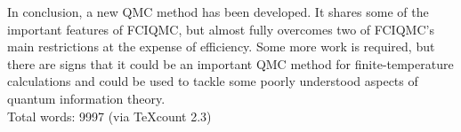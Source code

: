 In conclusion, a new QMC method has been developed. It shares some of the important features of FCIQMC, but almost fully overcomes two of FCIQMC's main restrictions at the expense of efficiency. Some more work is required, but there are signs that it could be an important QMC method for finite-temperature calculations and could be used to tackle some poorly understood aspects of quantum information theory.\\

\noindent Total words: 9997 (via TeXcount 2.3)



